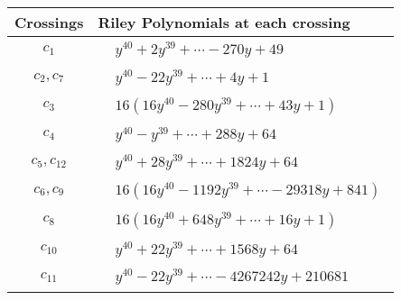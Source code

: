 \documentclass[1p]{elsarticle_modified}
\theoremstyle{definition}
\begin{document}
\begin{tabular}{m{50pt}|m{274pt}}
Crossings & \hspace{64pt}Riley Polynomials at each crossing \\
\hline $$\begin{aligned}c_{1}\end{aligned}$$&$\begin{aligned}
&y^{40}+2 y^{39}+\cdots-270 y+49
\end{aligned}$\\
\hline $$\begin{aligned}c_{2},c_{7}\end{aligned}$$&$\begin{aligned}
&y^{40}-22 y^{39}+\cdots+4 y+1
\end{aligned}$\\
\hline $$\begin{aligned}c_{3}\end{aligned}$$&$\begin{aligned}
&16(16 y^{40}-280 y^{39}+\cdots+43 y+1)
\end{aligned}$\\
\hline $$\begin{aligned}c_{4}\end{aligned}$$&$\begin{aligned}
&y^{40}- y^{39}+\cdots+288 y+64
\end{aligned}$\\
\hline $$\begin{aligned}c_{5},c_{12}\end{aligned}$$&$\begin{aligned}
&y^{40}+28 y^{39}+\cdots+1824 y+64
\end{aligned}$\\
\hline $$\begin{aligned}c_{6},c_{9}\end{aligned}$$&$\begin{aligned}
&16(16 y^{40}-1192 y^{39}+\cdots-29318 y+841)
\end{aligned}$\\
\hline $$\begin{aligned}c_{8}\end{aligned}$$&$\begin{aligned}
&16(16 y^{40}+648 y^{39}+\cdots+16 y+1)
\end{aligned}$\\
\hline $$\begin{aligned}c_{10}\end{aligned}$$&$\begin{aligned}
&y^{40}+22 y^{39}+\cdots+1568 y+64
\end{aligned}$\\
\hline $$\begin{aligned}c_{11}\end{aligned}$$&$\begin{aligned}
&y^{40}-22 y^{39}+\cdots-4267242 y+210681
\end{aligned}$\\
\hline
\end{tabular}\\~\\
\end{document}
